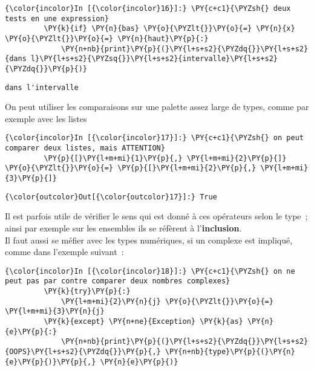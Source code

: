     \begin{Verbatim}[commandchars=\\\{\}]
{\color{incolor}In [{\color{incolor}16}]:} \PY{c+c1}{\PYZsh{} deux tests en une expression}
         \PY{k}{if} \PY{n}{bas} \PY{o}{\PYZlt{}}\PY{o}{=} \PY{n}{x} \PY{o}{\PYZlt{}}\PY{o}{=} \PY{n}{haut}\PY{p}{:}
             \PY{n+nb}{print}\PY{p}{(}\PY{l+s+s2}{\PYZdq{}}\PY{l+s+s2}{dans l}\PY{l+s+s2}{\PYZsq{}}\PY{l+s+s2}{intervalle}\PY{l+s+s2}{\PYZdq{}}\PY{p}{)}
\end{Verbatim}


    \begin{Verbatim}[commandchars=\\\{\}]
dans l'intervalle

    \end{Verbatim}

    On peut utiliser les comparaisons sur une palette assez large de types,
comme par exemple avec les listes

    \begin{Verbatim}[commandchars=\\\{\}]
{\color{incolor}In [{\color{incolor}17}]:} \PY{c+c1}{\PYZsh{} on peut comparer deux listes, mais ATTENTION}
         \PY{p}{[}\PY{l+m+mi}{1}\PY{p}{,} \PY{l+m+mi}{2}\PY{p}{]} \PY{o}{\PYZlt{}}\PY{o}{=} \PY{p}{[}\PY{l+m+mi}{2}\PY{p}{,} \PY{l+m+mi}{3}\PY{p}{]}
\end{Verbatim}


\begin{Verbatim}[commandchars=\\\{\}]
{\color{outcolor}Out[{\color{outcolor}17}]:} True
\end{Verbatim}
            
    Il est parfois utile de vérifier le sens qui est donné à ces opérateurs
selon le type~; ainsi par exemple sur les ensembles ils se réfèrent à
l'\textbf{inclusion}.\\

Il faut aussi se méfier avec les types numériques, si un complexe est
impliqué, comme dans l'exemple suivant~:

    \begin{Verbatim}[commandchars=\\\{\}]
{\color{incolor}In [{\color{incolor}18}]:} \PY{c+c1}{\PYZsh{} on ne peut pas par contre comparer deux nombres complexes}
         \PY{k}{try}\PY{p}{:}
             \PY{l+m+mi}{2}\PY{n}{j} \PY{o}{\PYZlt{}}\PY{o}{=} \PY{l+m+mi}{3}\PY{n}{j}
         \PY{k}{except} \PY{n+ne}{Exception} \PY{k}{as} \PY{n}{e}\PY{p}{:}
             \PY{n+nb}{print}\PY{p}{(}\PY{l+s+s2}{\PYZdq{}}\PY{l+s+s2}{OOPS}\PY{l+s+s2}{\PYZdq{}}\PY{p}{,} \PY{n+nb}{type}\PY{p}{(}\PY{n}{e}\PY{p}{)}\PY{p}{,} \PY{n}{e}\PY{p}{)}
\end{Verbatim}


